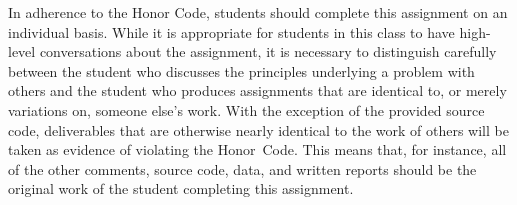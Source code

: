 \vspace*{-.1in}


In adherence to the Honor Code, students should complete this assignment on an individual basis. While it is appropriate
for students in this class to have high-level conversations about the assignment, it is necessary to distinguish
carefully between the student who discusses the principles underlying a problem with others and the student who produces
assignments that are identical to, or merely variations on, someone else's work.  With the exception of the provided
source code, deliverables that are otherwise nearly identical to the work of others will be taken as evidence of
violating the \mbox{Honor Code}. This means that, for instance, all of the other comments, source code, data, and
written reports should be the original work of the student completing this assignment.



